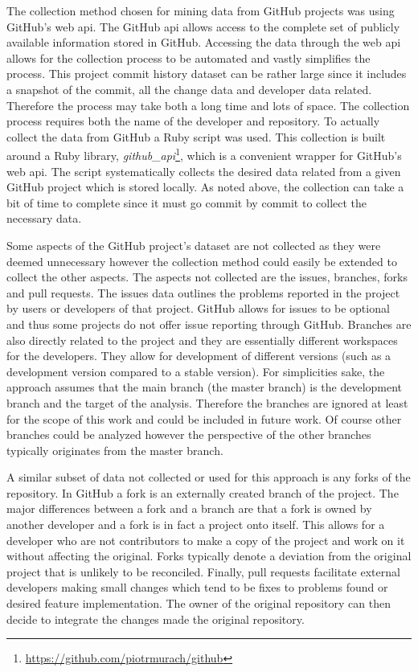
The collection method chosen for mining data from GitHub projects was using GitHub's web \gls{api}. The GitHub \gls{api} allows access to the complete set of publicly available information stored in GitHub. Accessing the data through the web \gls{api} allows for the collection process to be automated and vastly simplifies the process. This project commit history dataset can be rather large since it includes a snapshot of the commit, all the change data and developer data related. Therefore the process may take both a long time and lots of space. The collection process requires both the name of the developer and repository. To actually collect the data from GitHub a Ruby script was used. This collection is built around a Ruby library, \textit{github\_api}\footnote{\url{https://github.com/piotrmurach/github}}, which is a convenient wrapper for GitHub's web \gls{api}. The script systematically collects the desired data related from a given GitHub project which is stored locally. As noted above, the collection can take a bit of time to complete since it must go commit by commit to collect the necessary data.

Some aspects of the GitHub project's dataset are not collected as they were deemed unnecessary however the collection method could easily be extended to collect the other aspects. The aspects not collected are the issues, branches, forks and pull requests. The issues data outlines the problems reported in the project by users or developers of that project. GitHub allows for issues to be optional and thus some projects do not offer issue reporting through GitHub. Branches are also directly related to the project and they are essentially different workspaces for the developers. They allow for development of different versions (such as a development version compared to a stable version). For simplicities sake, the approach assumes that the main branch (the master branch) is the development branch and the target of the analysis. Therefore the branches are ignored at least for the scope of this work and could be included in future work. Of course other branches could be analyzed however the perspective of the other branches typically originates from the master branch.

A similar subset of data not collected or used for this approach is any forks of the repository. In GitHub a fork is an externally created branch of the project. The major differences between a fork and a branch are that a fork is owned by another developer and a fork is in fact a project onto itself. This allows for a developer who are not contributors to make a copy of the project and work on it without affecting the original. Forks typically denote a deviation from the original project that is unlikely to be reconciled. Finally, pull requests facilitate external developers making small changes which tend to be fixes to problems found or desired feature implementation. The owner of the original repository can then decide to integrate the changes made the original repository.


